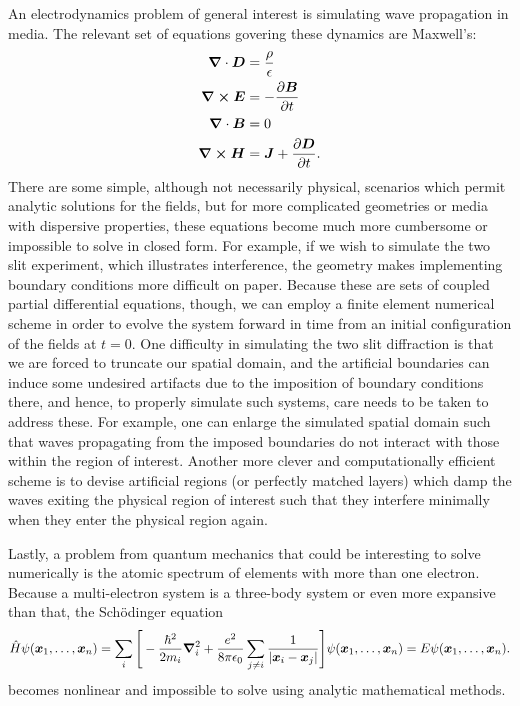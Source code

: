 {An electrodynamics problem of general interest is simulating wave propagation in media.
The relevant set of equations govering these dynamics are Maxwell's:
\begin{align}
    \grad \cdot \vb*{D} &= \frac{\rho}{\epsilon} \\
    \grad \cross \vb*{E} &= -\pdv{\vb*{B}}{t} \\
    \grad \cdot \vb*{B} &= 0 \\
    \grad \cross \vb*{H} &= \vb*{J} + \pdv{\vb*{D}}{t}
.\end{align}
There are some simple, although not necessarily physical, scenarios which permit analytic solutions for the fields, but for more complicated geometries or media with dispersive properties, these equations become much more cumbersome or impossible to solve in closed form.
For example, if we wish to simulate the two slit experiment, which illustrates interference, the geometry makes implementing boundary conditions more difficult on paper.
Because these are sets of coupled partial differential equations, though, we can employ a finite element numerical scheme in order to evolve the system forward in time from an initial configuration of the fields at $t = 0$.
One difficulty in simulating the two slit diffraction is that we are forced to truncate our spatial domain, and the artificial boundaries can induce some undesired artifacts due to the imposition of boundary conditions there, and hence, to properly simulate such systems, care needs to be taken to address these.
For example, one can enlarge the simulated spatial domain such that waves propagating from the imposed boundaries do not interact with those within the region of interest.
Another more clever and computationally efficient scheme is to devise artificial regions (or perfectly matched layers) which damp the waves exiting the physical region of interest such that they interfere minimally when they enter the physical region again.

Lastly, a problem from quantum mechanics that could be interesting to solve numerically is the atomic spectrum of elements with more than one electron.
Because a multi-electron system is a three-body system or even more expansive than that, the Sch\"{o}dinger equation
\begin{align}
\hat{H} \psi(\vb*{x}_{1},\ldots,\vb*{x}_{n}) = \sum_{i} \Bigg[ -\frac{\hbar^2}{2m_{i}} \grad_{i}^2 + \frac{e^2}{8 \pi \epsilon_0} \sum_{j \ne i} \frac{1}{|\vb*{x}_{i} - \vb*{x}_{j}|} \Bigg] \psi(\vb*{x}_{1},\ldots,\vb*{x}_{n}) = E \psi(\vb*{x}_{1},\ldots,\vb*{x}_{n})
.\end{align}
becomes nonlinear and impossible to solve using analytic mathematical methods.

}


